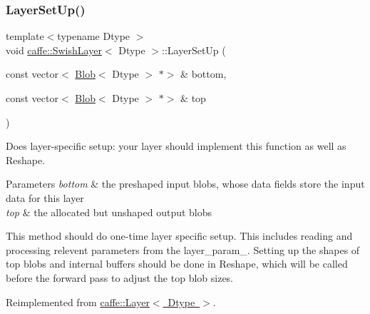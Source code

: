 \mbox{\label{classcaffe_1_1_swish_layer_a35bd01fae515cb064107c621a3c12820}} 
\subsubsection{\texorpdfstring{Layer\+Set\+Up()}{LayerSetUp()}\hspace{0.1cm}{\footnotesize\ttfamily [2/2]}}
{\footnotesize\ttfamily template$<$typename Dtype $>$ \\
void \mbox{\hyperlink{classcaffe_1_1_swish_layer}{caffe\+::\+Swish\+Layer}}$<$ Dtype $>$\+::Layer\+Set\+Up (\begin{DoxyParamCaption}\item[{const vector$<$ \mbox{\hyperlink{classcaffe_1_1_blob}{Blob}}$<$ Dtype $>$ $\ast$$>$ \&}]{bottom,  }\item[{const vector$<$ \mbox{\hyperlink{classcaffe_1_1_blob}{Blob}}$<$ Dtype $>$ $\ast$$>$ \&}]{top }\end{DoxyParamCaption})\hspace{0.3cm}{\ttfamily [virtual]}}



Does layer-\/specific setup\+: your layer should implement this function as well as Reshape. 


\begin{DoxyParams}{Parameters}
{\em bottom} & the preshaped input blobs, whose data fields store the input data for this layer \\
\hline
{\em top} & the allocated but unshaped output blobs\\
\hline
\end{DoxyParams}
This method should do one-\/time layer specific setup. This includes reading and processing relevent parameters from the {\ttfamily layer\+\_\+param\+\_\+}. Setting up the shapes of top blobs and internal buffers should be done in {\ttfamily Reshape}, which will be called before the forward pass to adjust the top blob sizes. 

Reimplemented from \mbox{\hyperlink{classcaffe_1_1_layer_a481323a3e0972c682787f2137468c29f}{caffe\+::\+Layer$<$ Dtype $>$}}.

